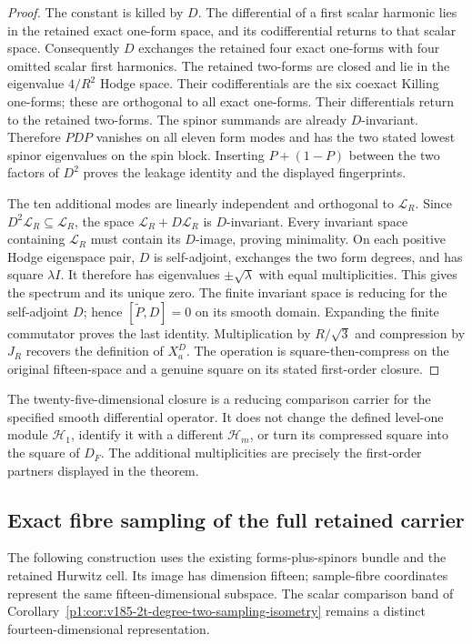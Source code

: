 \documentclass[11pt]{article}
\begin{document}
\begin{proof}
The constant is killed by \(D\). The differential of a first scalar
harmonic lies in the retained exact one-form space, and its codifferential
returns to that scalar space. Consequently \(D\) exchanges the retained
four exact one-forms with four omitted scalar first harmonics.
The retained two-forms are closed and lie in the eigenvalue \(4/R^2\)
Hodge space. Their codifferentials are the six coexact Killing
one-forms; these are orthogonal to all exact one-forms. Their differentials
return to the retained two-forms. The spinor summands are already
\(D\)-invariant. Therefore \(PDP\) vanishes on all eleven form modes
and has the two stated lowest spinor eigenvalues on the spin block.
Inserting \(P+(1-P)\) between the two factors of \(D^2\) proves the
leakage identity and the displayed fingerprints.

The ten additional modes are linearly independent and orthogonal to
\(\mathcal L_R\). Since \(D^2\mathcal L_R\subseteq\mathcal L_R\),
the space \(\mathcal L_R+D\mathcal L_R\) is \(D\)-invariant.
Every invariant space containing \(\mathcal L_R\) must contain its
\(D\)-image, proving minimality. On each positive Hodge eigenspace pair,
\(D\) is self-adjoint, exchanges the two form degrees, and has square
\(\lambda I\). It therefore has eigenvalues \(\pm\sqrt\lambda\)
with equal multiplicities. This gives the spectrum and its unique zero.
The finite invariant space is reducing for the self-adjoint \(D\);
hence \([\widetilde P,D]=0\) on its smooth domain. Expanding the
finite commutator proves the last identity. Multiplication by
\(R/\sqrt3\) and compression by \(J_R\) recovers the definition of
\(X_a^D\). The operation is square-then-compress on the original
fifteen-space and a genuine square on its stated first-order closure.
\end{proof}
\begin{remark}
The twenty-five-dimensional closure is a reducing comparison carrier for
the specified smooth differential operator. It does not change the defined
level-one module \(\mathcal H_1\), identify it with a different
\(\mathcal H_m\), or turn its compressed square into the square of
\(D_F\). The additional multiplicities are precisely the first-order
partners displayed in the theorem.
\end{remark}

\subsection{Exact fibre sampling of the full retained carrier}
\label{p1:sec:v203-full-carrier-sampling}
The following construction uses the existing forms-plus-spinors bundle and
the retained Hurwitz cell. Its image has dimension fifteen; sample-fibre
coordinates represent the same fifteen-dimensional subspace. The scalar comparison band of
Corollary~\ref{p1:cor:v185-2t-degree-two-sampling-isometry} remains a distinct
fourteen-dimensional representation.
\end{document}

